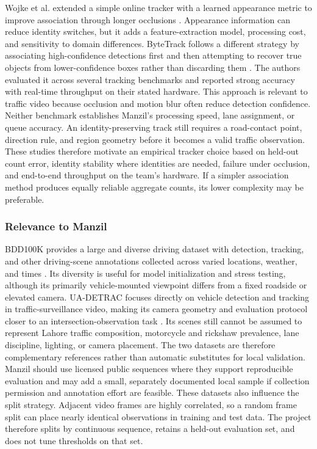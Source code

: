 Wojke et al. extended a simple online tracker with a learned appearance metric to improve association through longer occlusions \cite{wojke2017deepsort}. Appearance information can reduce identity switches, but it adds a feature-extraction model, processing cost, and sensitivity to domain differences. ByteTrack follows a different strategy by associating high-confidence detections first and then attempting to recover true objects from lower-confidence boxes rather than discarding them \cite{zhang2022bytetrack}. The authors evaluated it across several tracking benchmarks and reported strong accuracy with real-time throughput on their stated hardware. This approach is relevant to traffic video because occlusion and motion blur often reduce detection confidence. Neither benchmark establishes Manzil's processing speed, lane assignment, or queue accuracy. An identity-preserving track still requires a road-contact point, direction rule, and region geometry before it becomes a valid traffic observation. These studies therefore motivate an empirical tracker choice based on held-out count error, identity stability where identities are needed, failure under occlusion, and end-to-end throughput on the team's hardware. If a simpler association method produces equally reliable aggregate counts, its lower complexity may be preferable.

\subsubsection{Relevance to Manzil}

BDD100K provides a large and diverse driving dataset with detection, tracking, and other driving-scene annotations collected across varied locations, weather, and times \cite{yu2020bdd100k}. Its diversity is useful for model initialization and stress testing, although its primarily vehicle-mounted viewpoint differs from a fixed roadside or elevated camera. UA-DETRAC focuses directly on vehicle detection and tracking in traffic-surveillance video, making its camera geometry and evaluation protocol closer to an intersection-observation task \cite{wen2020uadetrac}. Its scenes still cannot be assumed to represent Lahore traffic composition, motorcycle and rickshaw prevalence, lane discipline, lighting, or camera placement. The two datasets are therefore complementary references rather than automatic substitutes for local validation. Manzil should use licensed public sequences where they support reproducible evaluation and may add a small, separately documented local sample if collection permission and annotation effort are feasible. These datasets also influence the split strategy. Adjacent video frames are highly correlated, so a random frame split can place nearly identical observations in training and test data. The project therefore splits by continuous sequence, retains a held-out evaluation set, and does not tune thresholds on that set.


